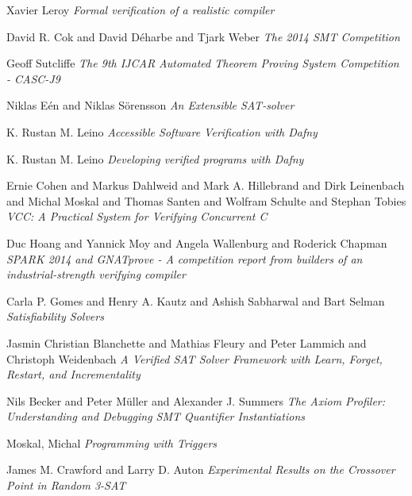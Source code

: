 \begin{thebibliography}{9}
Xavier Leroy
\textit{Formal verification of a realistic compiler}

David R. Cok and
               David D{\'{e}}harbe and
               Tjark Weber
\textit{The 2014 {SMT} Competition}

Geoff Sutcliffe
\textit{The 9th {IJCAR} Automated Theorem Proving System Competition - {CASC-J9}}

Niklas E{\'{e}}n and
               Niklas S{\"{o}}rensson
\textit{An Extensible SAT-solver}

K. Rustan M. Leino
\textit{Accessible Software Verification with Dafny}

K. Rustan M. Leino
\textit{Developing verified programs with {D}afny}

Ernie Cohen and
               Markus Dahlweid and
               Mark A. Hillebrand and
               Dirk Leinenbach and
               Michal Moskal and
               Thomas Santen and
               Wolfram Schulte and
               Stephan Tobies
\textit{{VCC:} {A} Practical System for Verifying Concurrent {C}}

Duc Hoang and
               Yannick Moy and
               Angela Wallenburg and
               Roderick Chapman
\textit{{SPARK} 2014 and GNATprove - {A} competition report from builders
of an industrial-strength verifying compiler}

Carla P. Gomes and
               Henry A. Kautz and
               Ashish Sabharwal and
               Bart Selman
\textit{Satisfiability Solvers}

Jasmin Christian Blanchette and
               Mathias Fleury and
               Peter Lammich and
               Christoph Weidenbach
\textit{A Verified {SAT} Solver Framework with Learn, Forget, Restart, and
Incrementality}

Nils Becker and
               Peter M{\"{u}}ller and
               Alexander J. Summers
\textit{The Axiom Profiler: Understanding and Debugging {SMT} Quantifier Instantiations}

Moskal, Michal
\textit{Programming with Triggers}

James M. Crawford and
               Larry D. Auton
\textit{Experimental Results on the Crossover Point in Random {3-SAT}}


\end{thebibliography}
